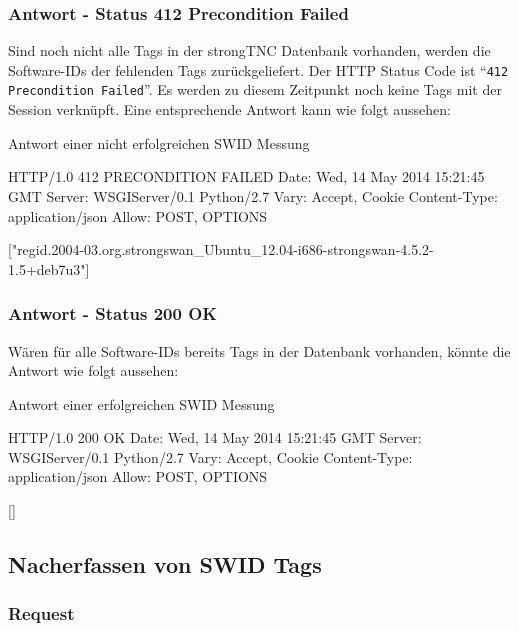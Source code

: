 \documentclass[10pt,a4paper]{scrartcl}
\begin{document}
\subsubsection{Antwort - Status 412 Precondition Failed}

Sind noch nicht alle Tags in der strongTNC Datenbank vorhanden, werden die
Software-IDs der fehlenden Tags zurückgeliefert. Der HTTP Status Code ist
``\texttt{412 Precondition Failed}''. Es werden zu diesem Zeitpunkt noch keine
Tags mit der Session verknüpft. Eine entsprechende Antwort kann wie folgt
aussehen:

\begin{listing}
\caption{Antwort einer nicht erfolgreichen SWID Messung}
\begin{httpcode}
HTTP/1.0 412 PRECONDITION FAILED
Date: Wed, 14 May 2014 15:21:45 GMT
Server: WSGIServer/0.1 Python/2.7
Vary: Accept, Cookie
Content-Type: application/json
Allow: POST, OPTIONS

["regid.2004-03.org.strongswan_Ubuntu_12.04-i686-strongswan-4.5.2-1.5+deb7u3"]
\end{httpcode}
\end{listing}

\subsubsection{Antwort - Status 200 OK}

Wären für alle Software-IDs bereits Tags in der Datenbank vorhanden, könnte die Antwort wie folgt aussehen:

\begin{listing}
\caption{Antwort einer erfolgreichen SWID Messung}
\begin{httpcode}
HTTP/1.0 200 OK
Date: Wed, 14 May 2014 15:21:45 GMT
Server: WSGIServer/0.1 Python/2.7
Vary: Accept, Cookie
Content-Type: application/json
Allow: POST, OPTIONS

[]
\end{httpcode}
\end{listing}

\subsection{Nacherfassen von SWID Tags}

\subsubsection{Request}
\end{document}
